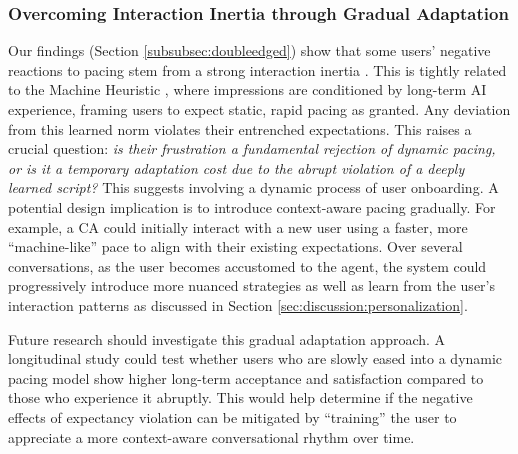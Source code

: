\subsubsection{Overcoming Interaction Inertia through Gradual Adaptation}
\label{subsubsec:adaptation}
Our findings (Section \ref{subsubsec:doubleedged}) show that some users' negative reactions to pacing stem from a strong interaction inertia \cite{gnewuch2022opposing}. This is tightly related to the Machine Heuristic \cite{10.1145/3290605.3300768}, where impressions are conditioned by long-term AI experience, framing users to expect static, rapid pacing as granted. Any deviation from this learned norm violates their entrenched expectations.
This raises a crucial question: \textit{is their frustration a fundamental rejection of dynamic pacing, or is it a temporary adaptation cost due to the abrupt violation of a deeply learned script?}
This suggests involving a dynamic process of user onboarding. A potential design implication is to introduce context-aware pacing gradually. For example, a CA could initially interact with a new user using a faster, more ``machine-like'' pace to align with their existing expectations. Over several conversations, as the user becomes accustomed to the agent, the system could progressively introduce more nuanced strategies as well as learn from the user's interaction patterns as discussed in Section \ref{sec:discussion:personalization}. 

Future research should investigate this gradual adaptation approach. A longitudinal study could test whether users who are slowly eased into a dynamic pacing model show higher long-term acceptance and satisfaction compared to those who experience it abruptly. This would help determine if the negative effects of expectancy violation can be mitigated by ``training'' the user to appreciate a more context-aware conversational rhythm over time.


